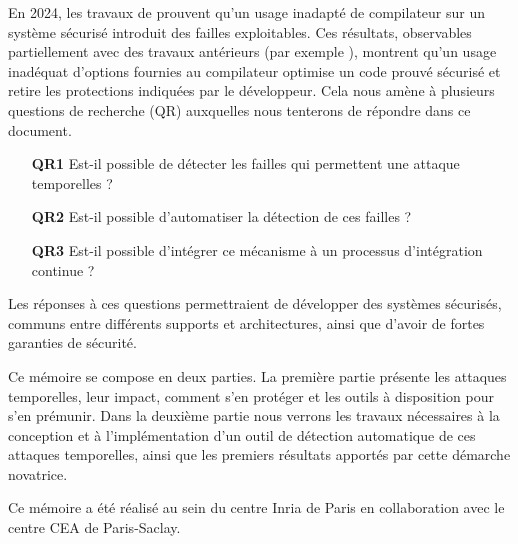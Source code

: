 En 2024, les travaux de \citeauthor{schneider2024breakingbadcompilersbreak} \cite{schneider2024breakingbadcompilersbreak} prouvent qu'un usage inadapté de compilateur sur un système sécurisé introduit des failles exploitables. Ces résultats, observables partiellement avec des travaux antérieurs (par exemple \cite{binsecRel2019}), montrent qu'un usage inadéquat d'options fournies au compilateur optimise un code prouvé sécurisé et retire les protections indiquées par le développeur. Cela nous amène à plusieurs questions de recherche (QR) auxquelles nous tenterons de répondre dans ce document.
\begin{enumerate}
    \item[\textbf{QR1}] Est-il possible de détecter les failles qui permettent une attaque temporelles ?
    \item[\textbf{QR2}] Est-il possible d'automatiser la détection de ces failles ?
    \item[\textbf{QR3}] Est-il possible d'intégrer ce mécanisme à un processus d'intégration continue ?
\end{enumerate}

Les réponses à ces questions permettraient de développer des systèmes sécurisés, communs entre différents supports et architectures, ainsi que d'avoir de fortes garanties de sécurité.\smallbreak

Ce mémoire se compose en deux parties. La première partie présente les attaques temporelles, leur impact, comment s'en protéger et les outils à disposition pour s'en prémunir. Dans la deuxième partie nous verrons les travaux nécessaires à la conception et à l'implémentation d'un outil de détection automatique de ces attaques temporelles, ainsi que les premiers résultats apportés par cette démarche novatrice.\medbreak

Ce mémoire a été réalisé au sein du centre Inria de Paris en collaboration avec le centre CEA de Paris-Saclay.

